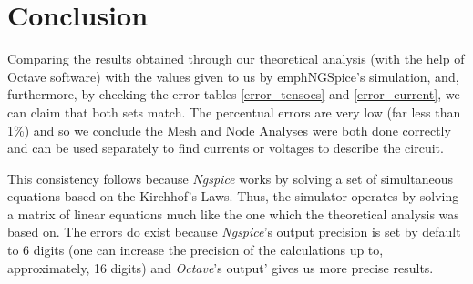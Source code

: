 \section{Conclusion}
\label{sec:conclusion}

Comparing the results obtained through our theoretical analysis (with the help of Octave
software) with the values given to us by emph{NGSpice}'s simulation, and, furthermore, by checking the
error tables \ref{error_tensoes} and \ref{error_current}, we can claim that both sets match. The percentual
errors are very low (far less than 1\%) and so we conclude the Mesh and Node Analyses were both done
correctly and can be used separately to find currents or voltages to describe the circuit.

\par

This consistency follows because \emph{Ngspice} works by solving a set of simultaneous equations
based on the Kirchhof's Laws. Thus, the simulator operates by solving a matrix of linear equations much
like the one which the theoretical analysis was based on. The errors do exist because \emph{Ngspice}'s output
precision is set by default to 6 digits (one can increase the precision of the calculations up to, approximately,
16 digits) and \emph{Octave}'s output' gives us more precise results.
